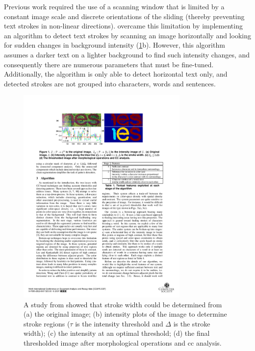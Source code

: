 Previous work required the use of a scanning window \citep{XiangrongChen:2004ha, Lienhart:2002ub, Jung:2009do} that is limited by a constant image scale and discrete orientations of the sliding (thereby preventing text strokes in non-linear directions). \citet{Subramanian:2007tf} overcame this limitation by implementing an algorithm to detect text strokes by scanning an image horizontally and looking for sudden changes in background intensity (\cref{fig:background:detection:cc:subramanian2007_intensity}b). However, this algorithm assumes a darker text on a lighter background to find such intensity changes, and consequently there are numerous parameters that must be fine-tuned. Additionally, the algorithm is only able to detect horizontal text only, and detected strokes are not grouped into characters, words and sentences.

\begin{figure}[h]
  \centering
  \includegraphics[width=0.75\textwidth]{images/background/subramanian2007_intensity}
  \caption[Stroke analysis from \citet{Subramanian:2007tf}]{A study from \citet{Subramanian:2007tf} showed that stroke width could be determined from (a) the original image; (b) intensity plots of the image to determine stroke regions ($\tau$ is the intensity threshold and $\Delta$ is the stroke width); (c) the intensity at an optimal threshold; (d) the final thresholded image after morphological operations and \gls{cc} analysis.}
  \label{fig:background:detection:cc:subramanian2007_intensity}
\end{figure}

